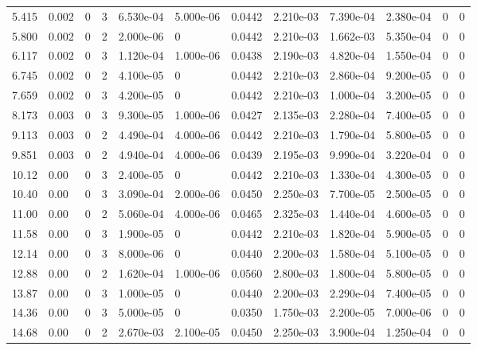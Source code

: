 \documentclass[preview]{standalone}
\begin{document}
{{\begin{tabular}{L{1.2cm}C{1.2cm} C{0.3cm}C{0.5cm} C{1.4cm}C{1.4cm} C{1.4cm}C{1.4cm} C{1.6cm}C{1.6cm} C{1.6cm}C{1.6cm}}
  5.415  &  0.002  & 0     &  3 &  6.530e-04  & 5.000e-06  &  0.0442&   2.210e-03& 7.390e-04 & 2.380e-04   &  0 & 0  \\ 
  5.800  &  0.002  & 0     &  2 &  2.000e-06  & 0  &  0.0442&   2.210e-03& 1.662e-03 & 5.350e-04   &  0 & 0  \\ 
  6.117  &  0.002  & 0     &  3 &  1.120e-04  & 1.000e-06  &  0.0438&   2.190e-03& 4.820e-04 & 1.550e-04   &  0 & 0  \\ 
  6.745  &  0.002  & 0     &  2 &  4.100e-05  & 0  &  0.0442&   2.210e-03& 2.860e-04 & 9.200e-05   &  0 & 0  \\ 
  7.659  &  0.002  & 0     &  3 &  4.200e-05  & 0  &  0.0442&   2.210e-03& 1.000e-04 & 3.200e-05   &  0 & 0  \\ 
  8.173  &  0.003  & 0     &  3 &  9.300e-05  & 1.000e-06  &  0.0427&   2.135e-03& 2.280e-04 & 7.400e-05   &  0 & 0  \\ 
  9.113  &  0.003  & 0     &  2 &  4.490e-04  & 4.000e-06  &  0.0442&   2.210e-03& 1.790e-04 & 5.800e-05   &  0 & 0  \\ 
  9.851  &  0.003  & 0     &  2 &  4.940e-04  & 4.000e-06  &  0.0439&   2.195e-03& 9.990e-04 & 3.220e-04   &  0 & 0  \\ 
  10.12  &  0.00  & 0     &  3 &  2.400e-05  & 0  &  0.0442&   2.210e-03& 1.330e-04 & 4.300e-05   &  0 & 0  \\ 
  10.40  &  0.00  & 0     &  3 &  3.090e-04  & 2.000e-06  &  0.0450&   2.250e-03& 7.700e-05 & 2.500e-05   &  0 & 0  \\ 
  11.00  &  0.00  & 0     &  2 &  5.060e-04  & 4.000e-06  &  0.0465&   2.325e-03& 1.440e-04 & 4.600e-05   &  0 & 0  \\ 
  11.58  &  0.00  & 0     &  3 &  1.900e-05  & 0  &  0.0442&   2.210e-03& 1.820e-04 & 5.900e-05   &  0 & 0  \\ 
  12.14  &  0.00  & 0     &  3 &  8.000e-06  & 0  &  0.0440&   2.200e-03& 1.580e-04 & 5.100e-05   &  0 & 0  \\ 
  12.88  &  0.00  & 0     &  2 &  1.620e-04  & 1.000e-06  &  0.0560&   2.800e-03& 1.800e-04 & 5.800e-05   &  0 & 0  \\ 
  13.87  &  0.00  & 0     &  3 &  1.000e-05  & 0  &  0.0440&   2.200e-03& 2.290e-04 & 7.400e-05   &  0 & 0  \\ 
  14.36  &  0.00  & 0     &  3 &  5.000e-05  & 0  &  0.0350&   1.750e-03& 2.200e-05 & 7.000e-06   &  0 & 0  \\ 
  14.68  &  0.00  & 0     &  2 &  2.670e-03  & 2.100e-05  &  0.0450&   2.250e-03& 3.900e-04 & 1.250e-04   &  0 & 0  \\ 

\end{tabular}}}
\end{document}
